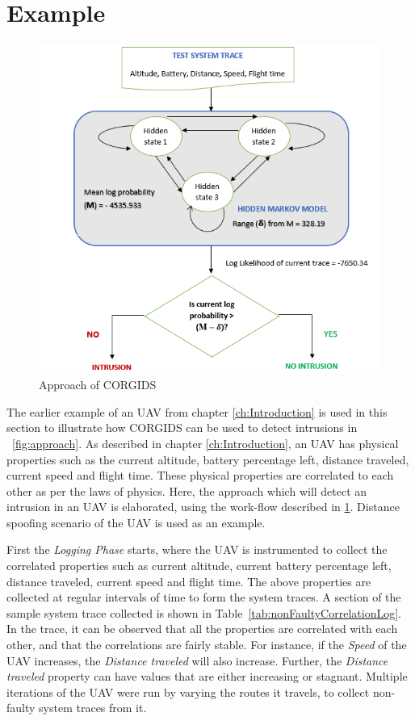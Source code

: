 \section{Example}

\begin{figure}[ht]
    \centering
    \includegraphics[scale=0.55,keepaspectratio = true]{Graphics/CORGIDSApproach.png}
    \caption{Approach of CORGIDS}
    \label{fig:approach}
\end{figure}

The earlier example of an \ac{UAV} from chapter \ref{ch:Introduction} is used in this section to illustrate how \ac{CORGIDS} can be used to detect intrusions in ~\autoref{fig:approach}. As described in chapter \ref{ch:Introduction}, an \ac{UAV} has physical properties such as the current altitude, battery percentage left, distance traveled, current speed and flight time. These physical properties are correlated to each other as per the laws of physics. Here, the approach which will detect an intrusion in an \ac{UAV} is elaborated, using the work-flow described in \ref{fig:approach}. Distance spoofing scenario of the \ac{UAV} is used as an example.

First the \textit{Logging Phase} starts, where the \ac{UAV} is instrumented to collect the correlated properties such as current altitude, current battery percentage left, distance traveled, current speed and flight time. The above properties are collected at regular intervals of time to form the system traces. A section of the sample system trace collected is shown in Table~\ref{tab:nonFaultyCorrelationLog}. In the trace, it can be observed that all the properties are correlated  with each other, and that the correlations are fairly stable. For instance, if the \textit{Speed} of the \ac{UAV} increases, the \textit{Distance traveled} will also increase. Further, the \textit{Distance traveled} property can have values that are either increasing or stagnant. Multiple iterations of the \ac{UAV} were run by varying the routes it travels, to collect non-faulty system traces from it.

